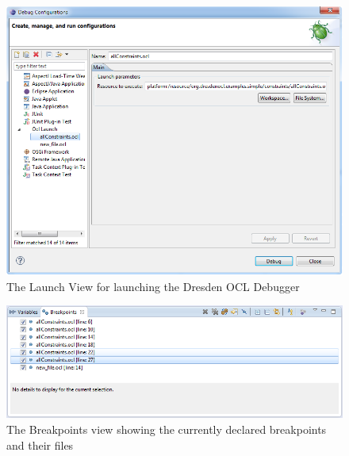 \begin{figure}[tbp]
	\centering
	\includegraphics[width=\textwidth,height=\textheight,keepaspectratio]{figures/interpreter/debug03}
  \caption{The Launch View for launching the Dresden OCL Debugger} 
  \label{pic:interpret:debug03}
\end{figure}

\begin{figure}[tbp]
	\centering
	\includegraphics[width=\textwidth,height=\textheight,keepaspectratio]{figures/interpreter/debug04}
  \caption{The Breakpoints view showing the currently declared breakpoints and their files}
  \label{pic:interpret:debug04} 
\end{figure}

